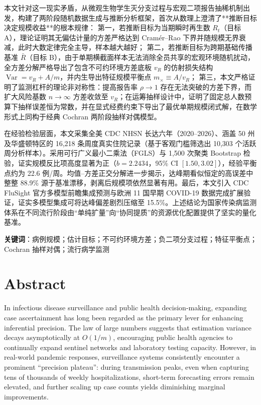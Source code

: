 \documentclass[12pt,a4paper,openany,twoside]{ctexbook}
\theoremstyle{plain}
\theoremstyle{definition}
\theoremstyle{remark}
\begin{document}
本文针对这一现实矛盾，从微观生物学生灭分支过程与宏观二项报告抽稀机制出发，构建了两阶段随机数据生成与推断分析框架，首次从数理上澄清了**推断目标决定规模收益**的根本规律：
第一，若推断目标为当期瞬时再生数 $R_t$（目标 A），理论证明其无偏估计量的方差严格达到 Cramér--Rao 下界并随规模无界衰减，此时大数定律完全主导，样本越大越好；
第二，若推断目标为跨期基础传播基准 $\bar{R}$（目标 B），由于单期横截面样本无法消除全员共享的宏观环境随机扰动，全方差分解严格导出了包含不可约环境方差底板 $v_R$ 的仿射损失结构 $\operatorname{Var} = v_R + A/m$，并内生导出特征规模平衡点 $m_\times \equiv A/v_R$；
第三，本文严格证明了监测杠杆的理论非对称性：提高报告率 $\rho \to 1$ 存在无法突破的方差下界，而扩大风险基数 $n \to \infty$ 方差收敛至 $v_R$；在运筹抽样设计中，证明了固定总人数预算下抽样误差恒为常数，并在显式经费约束下导出了最优单期规模闭式解，在数学形式上同构于经典 Cochran 两阶段抽样对偶模型。

在经验检验层面，本文采集全美 CDC NHSN 长达六年（2020--2026）、涵盖 50 州及华盛顿特区的 16,218 条周度真实住院记录（基于客观门槛筛选出 10,303 个活跃周分析样本）。采用可行广义最小二乘法（FGLS）与 1,500 次聚类 Bootstrap 检验，证实规模反比项高度显著为正（$\hat{b} = 2.2434$，95\% CI $[1.50, 3.02]$），经验平衡点约为 22.6 例/周。均值--方差正交分解进一步揭示，达峰期看似恒定的高误差中整整 88.9\% 源于基准漂移，剥离后规模项依然显著有用。最后，本文引入 CDC FluSight 官方多模型前瞻集成预测与欧洲 11 国早期 COVID-19 数据完成扩展验证，证实多模型集成可将达峰偏差剧烈压缩至 15.5\%。上述结论为国家传染病监测体系在不同流行阶段由“单纯扩量”向“协同提质”的资源优化配置提供了坚实的量化基准。

\vspace{1.5ex}
\noindent\textbf{关键词}：病例规模；估计目标；不可约环境方差；负二项分支过程；特征平衡点；Cochran 抽样对偶；流行病学监测

\chapter*{Abstract}

In infectious disease surveillance and public health decision-making, expanding case ascertainment has long been regarded as the primary lever for enhancing inferential precision. The law of large numbers suggests that estimation variance decays asymptotically at $O(1/m)$, encouraging public health agencies to continually expand sentinel networks and laboratory testing capacity. However, in real-world pandemic responses, surveillance systems consistently encounter a prominent ``precision plateau'': during transmission peaks, even when capturing tens of thousands of weekly hospitalizations, short-term forecasting errors remain elevated, and further scaling up case counts yields diminishing marginal improvements.
\end{document}
